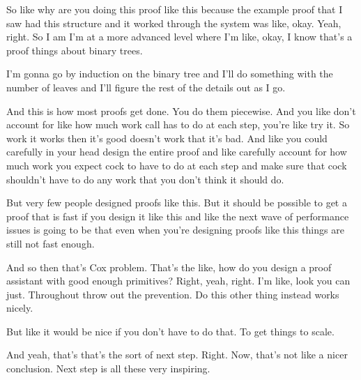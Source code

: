 So like why are you doing this proof like this because the example proof that I saw had this structure and it worked through the system was like, okay. Yeah, right. So I am I'm at a more advanced level where I'm like, okay, I know that's a proof things about binary trees. 

I'm gonna go by induction on the binary tree and I'll do something with the number of leaves and I'll figure the rest of the details out as I go. 

And this is how most proofs get done. You do them piecewise. And you like don't account for like how much work call has to do at each step, you're like try it. So work it works then it's good doesn't work that it's bad. And like you could carefully in your head design the entire proof and like carefully account for how much work you expect cock to have to do at each step and make sure that cock shouldn't have to do any work that you don't think it should do. 

But very few people designed proofs like this. But it should be possible to get a proof that is fast if you design it like this and like the next wave of performance issues is going to be that even when you're designing proofs like this things are still not fast enough. 

And so then that's Cox problem. That's the like, how do you design a proof assistant with good enough primitives? Right, yeah, right. I'm like, look you can just. Throughout throw out the prevention. Do this other thing instead works nicely. 

But like it would be nice if you don't have to do that. To get things to scale. 

And yeah, that's that's the sort of next step. Right. Now, that's not like a nicer conclusion. Next step is all these very inspiring. 

